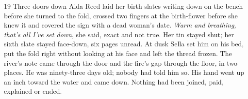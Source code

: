 \begin{CRchronicle}{19}
Three doors down Alda Reed laid her birth-slates writing-down on the bench before she turned to the fold, crossed two fingers at the birth-flower before she knew it and covered the sign with a dead woman’s date. \emph{Warm and breathing, that’s all I’ve set down}, she said, exact and not true. Her tin stayed shut; her sixth slate stayed face-down, six pages unread. At dusk Sella set him on his bed, put the fold right without looking at his face and left the thread frozen. The river’s note came through the door and the fire’s gap through the floor, in two places. He was ninety-three days old; nobody had told him so. His hand went up an inch toward the water and came down. Nothing had been joined, paid, explained or ended.
\end{CRchronicle}
